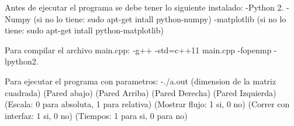 Antes de ejecutar el programa se debe tener lo siguiente instalado\+: -\/\+Python 2. -\/\+Numpy (si no lo tiene\+: sudo apt-\/get intall python-\/numpy) -\/matplotlib (si no lo tiene\+: sudo apt-\/get intall python-\/matplotlib)

Para compilar el archivo main.\+cpp\+: -\/g++ -\/std=c++11 main.\+cpp -\/fopenmp -\/lpython2.

Para ejecutar el programa con parametros\+: -\/./a.out (dimension de la matriz cuadrada) (Pared abajo) (Pared Arriba) (Pared Derecha) (Pared Izquierda) (Escala\+: 0 para absoluta, 1 para relativa) (Mostrar flujo\+: 1 si, 0 no) (Correr con interfaz\+: 1 si, 0 no) (Tiempos\+: 1 para si, 0 para no) 
